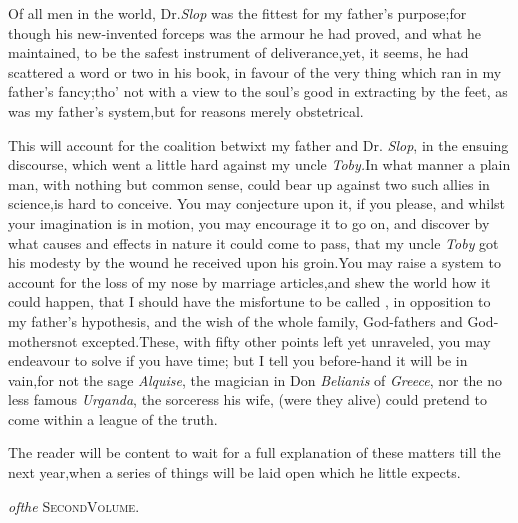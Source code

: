 \documentclass{article}
\begin{document}
Of all men in the world, Dr.\@ \textit{Slop} was the fittest for my
father’s purpose;\tsh for though his new-invented
forceps was the armour he had proved, and what he maintained, to be
the safest instrument of deliverance,\tsk yet, it seems, he had
scattered a word or two in his book, in favour of the very thing
which ran in my father’s fancy;\tsh tho’ not
with a view to the soul’s good in extracting by the feet, as
was my father’s system,\tsk but for reasons merely
obstetrical.

This will account for the coalition betwixt my father and Dr.\@
\textit{Slop}, in the ensuing discourse, which went a little
hard against my uncle \textit{Toby.}\tsk In what manner a plain
man, with nothing but common sense, could bear up against two
such allies in science,\tsk is hard to conceive.\tsk\break
You may conjecture upon it, if you please,\break
\tsk and whilst your imagination is in motion, you may encourage
it to go on, and discover by what causes and effects in nature
it could come to pass, that my uncle \textit{Toby} got his
modesty by the wound he received upon his groin.\tsk You may
raise a system to account for the loss of my nose by
marriage articles,\tsk and shew the world how it could happen,
that I should have the misfortune to be called
, in opposition to my father’s
hypothesis, and the wish of the whole family, God-fathers and
God-mothers\break not excepted.\tsk These, with fifty other points left
yet unraveled, you may endeavour to solve if you have time;\tsh
but I tell you before-hand it will be in vain,\break\tsk for not the sage
\textit{Alquise}, the magician in Don \textit{Belianis} of
\textit{Greece}, nor the no less famous \textit{Urganda}, the
sorceress his wife, (were they alive) could pretend to come
within a league of the truth.

The reader will be content to wait for a full explanation of
these matters till the next year,\tsk when a series of
things will be laid open which he little expects.

\bigskip
\bigskip
\centerline{\textit{\enspace of\enspace the}\enspace
\textsc{Second\enspace Volume}.}
\end{document}

